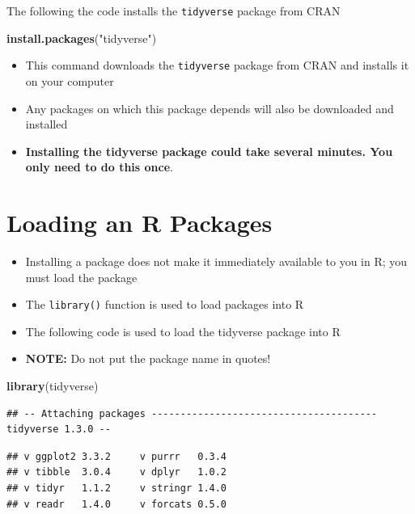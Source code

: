 \documentclass[]{book}
\newenvironment{Shaded}{\begin{snugshade}}{\end{snugshade}}
\newcommand{\KeywordTok}[1]{\textcolor[rgb]{0.13,0.29,0.53}{\textbf{#1}}}
\newcommand{\NormalTok}[1]{#1}
\newcommand{\StringTok}[1]{\textcolor[rgb]{0.31,0.60,0.02}{#1}}
\begin{document}
The following the code installs the \texttt{tidyverse} package from CRAN

\begin{Shaded}
\begin{Highlighting}[]
\KeywordTok{install.packages}\NormalTok{(}\StringTok{"tidyverse"}\NormalTok{)}
\end{Highlighting}
\end{Shaded}

\begin{itemize}
\item
  This command downloads the \texttt{tidyverse} package from CRAN and installs it on your computer
\item
  Any packages on which this package depends will also be downloaded and installed
\item
  \textbf{Installing the tidyverse package could take several minutes. You only need to do this once}.
\end{itemize}

\hypertarget{loading-an-r-packages}{%
\section{Loading an R Packages}\label{loading-an-r-packages}}

\begin{itemize}
\item
  Installing a package does not make it immediately available to you in R; you must load the package
\item
  The \texttt{library()} function is used to load packages into R
\item
  The following code is used to load the tidyverse package into R
\item
  \textbf{NOTE:} Do not put the package name in quotes!
\end{itemize}

\begin{Shaded}
\begin{Highlighting}[]
\KeywordTok{library}\NormalTok{(tidyverse)}
\end{Highlighting}
\end{Shaded}

\begin{verbatim}
## -- Attaching packages --------------------------------------- tidyverse 1.3.0 --
\end{verbatim}

\begin{verbatim}
## v ggplot2 3.3.2     v purrr   0.3.4
## v tibble  3.0.4     v dplyr   1.0.2
## v tidyr   1.1.2     v stringr 1.4.0
## v readr   1.4.0     v forcats 0.5.0
\end{verbatim}
\end{document}
